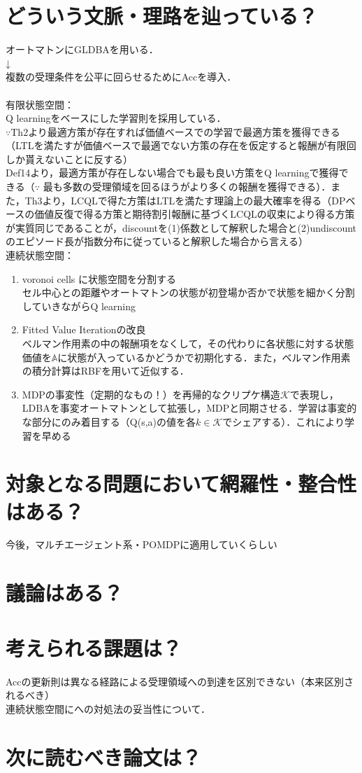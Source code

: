 \documentclass[10.5pt,a4j]{jsarticle}
\begin{document}
\section{どういう文脈・理路を辿っている？}
オートマトンにGLDBAを用いる．\\
↓\\
複数の受理条件を公平に回らせるためにAccを導入．\\
\\

有限状態空間：\\
Q learningをベースにした学習則を採用している．\\
$\because$Th2より最適方策が存在すれば価値ベースでの学習で最適方策を獲得できる（LTLを満たすが価値ベースで最適でない方策の存在を仮定すると報酬が有限回しか貰えないことに反する）\\
Def14より，最適方策が存在しない場合でも最も良い方策をQ learningで獲得できる（$\because$ 最も多数の受理領域を回るほうがより多くの報酬を獲得できる）．また，Th3より，LCQLで得た方策はLTLを満たす理論上の最大確率を得る（DPベースの価値反復で得る方策と期待割引報酬に基づくLCQLの収束により得る方策が実質同じであることが，discountを(1)係数として解釈した場合と(2)undiscountのエピソード長が指数分布に従っていると解釈した場合から言える）\\

連続状態空間：\\
\begin{enumerate}
  \item voronoi cells に状態空間を分割する\\
  セル中心との距離やオートマトンの状態が初登場か否かで状態を細かく分割していきながらQ learning
  \item Fitted  Value Iterationの改良\\
  ベルマン作用素の中の報酬項をなくして，その代わりに各状態に対する状態価値を${\mathbb A}$に状態が入っているかどうかで初期化する．また，ベルマン作用素の積分計算はRBFを用いて近似する．
  \item MDPの事変性（定期的なもの！）を再帰的なクリプケ構造$\mathcal{K}$で表現し，LDBAを事変オートマトンとして拡張し，MDPと同期させる．学習は事変的な部分にのみ着目する（Q(s,a)の値を各$k\in \mathcal{K}$でシェアする）．これにより学習を早める
\end{enumerate}

\section{対象となる問題において網羅性・整合性はある？}
今後，マルチエージェント系・POMDPに適用していくらしい

\section{議論はある？}

\section{考えられる課題は？}
Accの更新則は異なる経路による受理領域への到達を区別できない（本来区別されるべき）\\
連続状態空間にへの対処法の妥当性について．

\section{次に読むべき論文は？}
\end{document}
